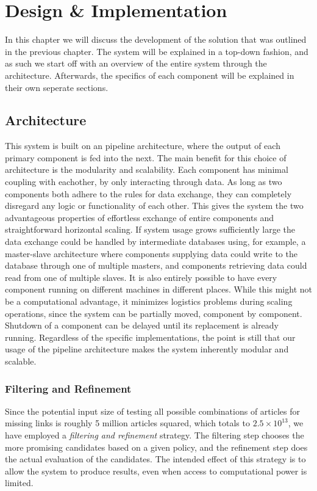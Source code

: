 \chapter{Design \& Implementation}\label{chap:design}
In this chapter we will discuss the development of the solution that was outlined in the previous chapter. The system will be explained in a top-down fashion, and as such we start off with an overview of the entire system through the architecture. Afterwards, the specifics of each component will be explained in their own seperate sections.

\section{Architecture}\label{sec:design_overview}
This system is built on an pipeline architecture, where the output of each primary component is fed into the next. The main benefit for this choice of architecture is the modularity and scalability. Each component has minimal coupling with eachother, by only interacting through data. As long as two components both adhere to the rules for data exchange, they can completely disregard any logic or functionality of each other. This gives the system the two advantageous properties of effortless exchange of entire components and straightforward horizontal scaling. If system usage grows sufficiently large the data exchange could be handled by intermediate databases using, for example, a master-slave architecture where components supplying data could write to the database through one of multiple masters, and components retrieving data could read from one of multiple slaves. It is also entirely possible to have every component running on different machines in different places. While this might not be a computational advantage, it minimizes logistics problems during scaling operations, since the system can be partially moved, component by component. Shutdown of a component can be delayed until its replacement is already running. Regardless of the specific implementations, the point is still that our usage of the pipeline architecture makes the system inherently modular and scalable.

\subsection{Filtering and Refinement}
Since the potential input size of testing all possible combinations of articles for missing links is roughly 5 million articles squared, which totals to $2.5 \times 10^{13}$, we have employed a \emph{filtering and refinement} strategy. The filtering step chooses the more promising candidates based on a given policy, and the refinement step does the actual evaluation of the candidates. The intended effect of this strategy is to allow the system to produce results, even when access to computational power is limited.

